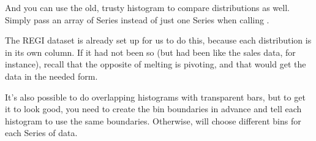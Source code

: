 \documentclass[letterpaper,10pt,english]{sphinxmanual}
\begin{document}
\noindent{}

And you can use the old, trusty histogram to compare distributions as well.  Simply pass an array of Series instead of just one Series when calling .

\begin{sphinxVerbatim}[commandchars=\\\{\}]
 \PYG{p}{[} \PYG{p}{[}\PYG{p}{]} \PYG{p}{[}\PYG{p}{]} \PYG{p}{]} \PYG{p}{[}   \PYG{p}{]} 
\end{sphinxVerbatim}

\noindent{}

The REGI dataset is already set up for us to do this, because each distribution is in its own column.  If it had not been so (but had been like the sales data, for instance), recall that the opposite of melting is pivoting, and that would get the data in the needed form.

It’s also possible to do overlapping histograms with transparent bars, but to get it to look good, you need to create the bin boundaries in advance and tell each histogram to use the same boundaries.  Otherwise,  will choose different bins for each Series of data.

\begin{sphinxVerbatim}[commandchars=\\\{\}]
       
 \PYG{p}{[}\PYG{p}{]}     
 \PYG{p}{[}\PYG{p}{]}     
\end{sphinxVerbatim}
\end{document}
